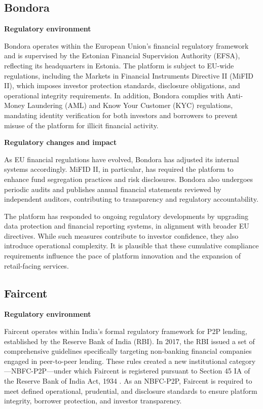 \documentclass[pdflatex,sn-apa]{sn-jnl}%
\theoremstyle{thmstyleone}%
\theoremstyle{thmstyletwo}%
\theoremstyle{thmstylethree}%
\begin{document}
\subsection{Bondora}

\textbf{Regulatory environment} 

Bondora operates within the European Union's financial regulatory framework and is supervised by the Estonian Financial Supervision Authority (EFSA), reflecting its headquarters in Estonia. The platform is subject to EU-wide regulations, including the Markets in Financial Instruments Directive II (MiFID II), which imposes investor protection standards, disclosure obligations, and operational integrity requirements. In addition, Bondora complies with Anti-Money Laundering (AML) and Know Your Customer (KYC) regulations, mandating identity verification for both investors and borrowers to prevent misuse of the platform for illicit financial activity.

\textbf{Regulatory changes and impact} 

As EU financial regulations have evolved, Bondora has adjusted its internal systems accordingly. MiFID II, in particular, has required the platform to enhance fund segregation practices and risk disclosures. Bondora also undergoes periodic audits and publishes annual financial statements reviewed by independent auditors, contributing to transparency and regulatory accountability.

The platform has responded to ongoing regulatory developments by upgrading data protection and financial reporting systems, in alignment with broader EU directives. While such measures contribute to investor confidence, they also introduce operational complexity. It is plausible that these cumulative compliance requirements influence the pace of platform innovation and the expansion of retail-facing services.

\subsection{Faircent}

\textbf{Regulatory environment}

Faircent operates within India’s formal regulatory framework for P2P lending, established by the Reserve Bank of India (RBI). In 2017, the RBI issued a set of comprehensive guidelines specifically targeting non-banking financial companies engaged in peer-to-peer lending. These rules created a new institutional category—NBFC-P2P—under which Faircent is registered pursuant to Section 45 IA of the Reserve Bank of India Act, 1934 \citep{rbi_non-banking_2017}. As an NBFC-P2P, Faircent is required to meet defined operational, prudential, and disclosure standards to ensure platform integrity, borrower protection, and investor transparency.
\end{document}
